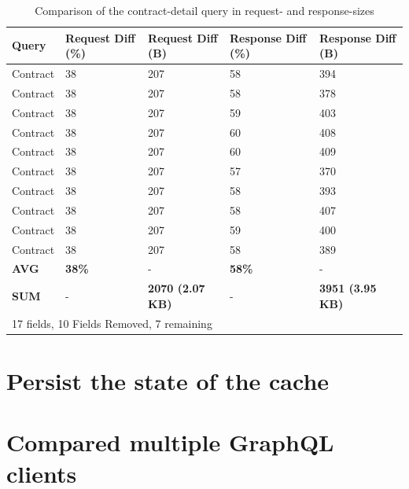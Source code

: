  \ifshowTables
 \begin{table}[H]
   \begin{tabular}{|l|l|l|l|l|}
   \hline
   Query  & Request Diff (\%)  & Request Diff (B) & Response Diff (\%) & Response Diff (B)  \\
   \hline
   Contract & 38\ & 207 & 58\ & 394 \\
   \hline
   Contract & 38\ & 207 & 58\ & 378 \\
   \hline
   Contract & 38\ & 207 & 59\ & 403 \\
   \hline
   Contract & 38\ & 207 & 60\ & 408 \\
   \hline
   Contract & 38\ & 207 & 60\ & 409 \\
   \hline
   Contract & 38\ & 207 & 57\ & 370 \\
   \hline
   Contract & 38\ & 207 & 58\ & 393 \\
   \hline
   Contract & 38\ & 207 & 58\ & 407 \\
   \hline
   Contract & 38\ & 207 & 59\ & 400 \\
   \hline
   Contract & 38\ & 207 & 58\ & 389 \\
   \hline
   \hline
   \textbf{AVG} & \textbf{38\%} & - & \textbf{58\%} & - \\
   \hline
   \textbf{SUM} & - & \textbf{2070 (2.07 KB)} & - & \textbf{3951 (3.95 KB)} \\
   \hline
   \multicolumn{5}{l}{17 fields, 10 Fields Removed, 7 remaining}
   \end{tabular}
   \caption{Comparison of the contract-detail query in request- and response-sizes}\label{table:code:comparison-contract-reduction}
 \end{table}
 \fi

 \section{Persist the state of the cache}
 \section{Compared multiple GraphQL clients}

